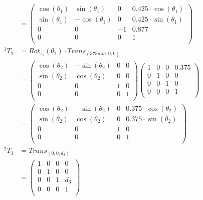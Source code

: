 \documentclass[a4paper,11pt]{article}
\begin{document}
\begin {enumerate}
\begin{enumerate}
\begin{align*}
        	&= \begin{pmatrix}
        		\cos(\theta_1) & \sin(\theta_1) & 0 & 0.425 \cdot \cos(\theta_1)\\
        		\sin(\theta_1) & -\cos(\theta_1) & 0 & 0.425 \cdot \sin(\theta_1)\\
        		0 & 0 & -1 & 0.877\\
        		0 & 0 & 0 & 1\\
        	\end{pmatrix}\\
        	{^1T_2} &= Rot_{z_1}(\theta_2) \cdot Trans_{(375mm,0,0)}\\
        	&= \begin{pmatrix}
        		\cos(\theta_2) & -\sin(\theta_2) & 0 & 0\\
        		\sin(\theta_2) & \cos(\theta_2) & 0 & 0\\
        		0 & 0 & 1 & 0\\
        		0 & 0 & 0 & 1\\
        	\end{pmatrix}
        	\begin{pmatrix}
        		1 & 0 & 0 & 0.375\\
        		0 & 1 & 0 & 0\\
        		0 & 0 & 1 & 0\\
        		0 & 0 & 0 & 1\\
        	\end{pmatrix}\\
        	&= \begin{pmatrix}
        		\cos(\theta_2) & -\sin(\theta_2) & 0 & 0.375 \cdot \cos(\theta_2)\\
        		\sin(\theta_2) & \cos(\theta_2) & 0 & 0.375 \cdot \sin(\theta_2)\\
        		0 & 0 & 1 & 0\\
        		0 & 0 & 0 & 1\\
        	\end{pmatrix}\\
        	{^2T_3} &= Trans_{(0,0,d_3)}\\
        	&= \begin{pmatrix}
        		1 & 0 & 0 & 0\\
        		0 & 1 & 0 & 0\\
        		0 & 0 & 1 & d_3\\
        		0 & 0 & 0 & 1\\
        	\end{pmatrix}\\

\end{align*}
\end{enumerate}
\end{enumerate}
\end{document}
